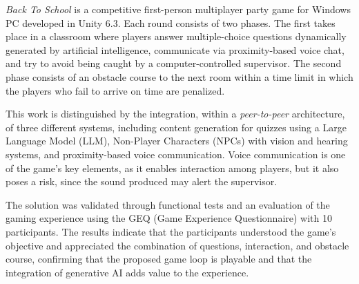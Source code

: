 \textit{Back To School} is a competitive first-person multiplayer party game for Windows PC developed in Unity 6.3. Each round consists of two phases. The first takes place in a classroom where players answer multiple-choice questions dynamically generated by artificial intelligence, communicate via proximity-based voice chat, and try to avoid being caught by a computer-controlled supervisor. The second phase consists of an obstacle course to the next room within a time limit in which the players who fail to arrive on time are penalized.

This work is distinguished by the integration, within a \textit{peer-to-peer} architecture, of three different systems, including content generation for quizzes using a Large Language Model (LLM), Non-Player Characters (NPCs) with vision and hearing systems, and proximity-based voice communication. Voice communication is one of the game's key elements, as it enables interaction among players, but it also poses a risk, since the sound produced may alert the supervisor.

The solution was validated through functional tests and an evaluation of the gaming experience using the GEQ (Game Experience Questionnaire) with 10 participants. The results indicate that the participants understood the game's objective and appreciated the combination of questions, interaction, and obstacle course, confirming that the proposed game loop is playable and that the integration of generative AI adds value to the experience.
